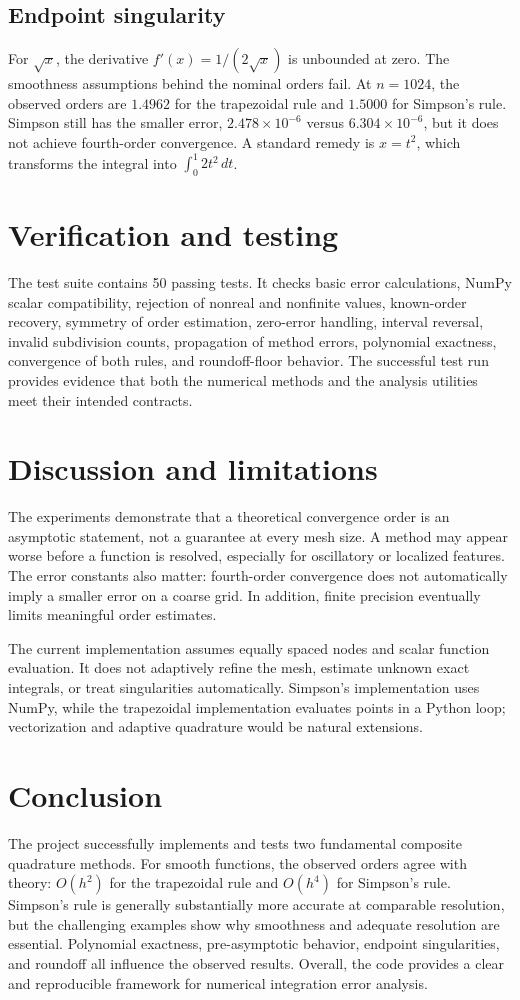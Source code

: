 \documentclass[11pt]{article}
\begin{document}
\subsection{Endpoint singularity}
For $\sqrt{x}$, the derivative $f'(x)=1/(2\sqrt{x})$ is unbounded at zero. The smoothness assumptions behind the nominal orders fail. At $n=1024$, the observed orders are $1.4962$ for the trapezoidal rule and $1.5000$ for Simpson's rule. Simpson still has the smaller error, $2.478\times10^{-6}$ versus $6.304\times10^{-6}$, but it does not achieve fourth-order convergence. A standard remedy is $x=t^2$, which transforms the integral into $\int_0^1 2t^2\,dt$.

\section{Verification and testing}
The test suite contains 50 passing tests. It checks basic error calculations, NumPy scalar compatibility, rejection of nonreal and nonfinite values, known-order recovery, symmetry of order estimation, zero-error handling, interval reversal, invalid subdivision counts, propagation of method errors, polynomial exactness, convergence of both rules, and roundoff-floor behavior. The successful test run provides evidence that both the numerical methods and the analysis utilities meet their intended contracts.

\section{Discussion and limitations}
The experiments demonstrate that a theoretical convergence order is an asymptotic statement, not a guarantee at every mesh size. A method may appear worse before a function is resolved, especially for oscillatory or localized features. The error constants also matter: fourth-order convergence does not automatically imply a smaller error on a coarse grid. In addition, finite precision eventually limits meaningful order estimates.

The current implementation assumes equally spaced nodes and scalar function evaluation. It does not adaptively refine the mesh, estimate unknown exact integrals, or treat singularities automatically. Simpson's implementation uses NumPy, while the trapezoidal implementation evaluates points in a Python loop; vectorization and adaptive quadrature would be natural extensions.

\section{Conclusion}
The project successfully implements and tests two fundamental composite quadrature methods. For smooth functions, the observed orders agree with theory: $O(h^2)$ for the trapezoidal rule and $O(h^4)$ for Simpson's rule. Simpson's rule is generally substantially more accurate at comparable resolution, but the challenging examples show why smoothness and adequate resolution are essential. Polynomial exactness, pre-asymptotic behavior, endpoint singularities, and roundoff all influence the observed results. Overall, the code provides a clear and reproducible framework for numerical integration error analysis.
\end{document}

